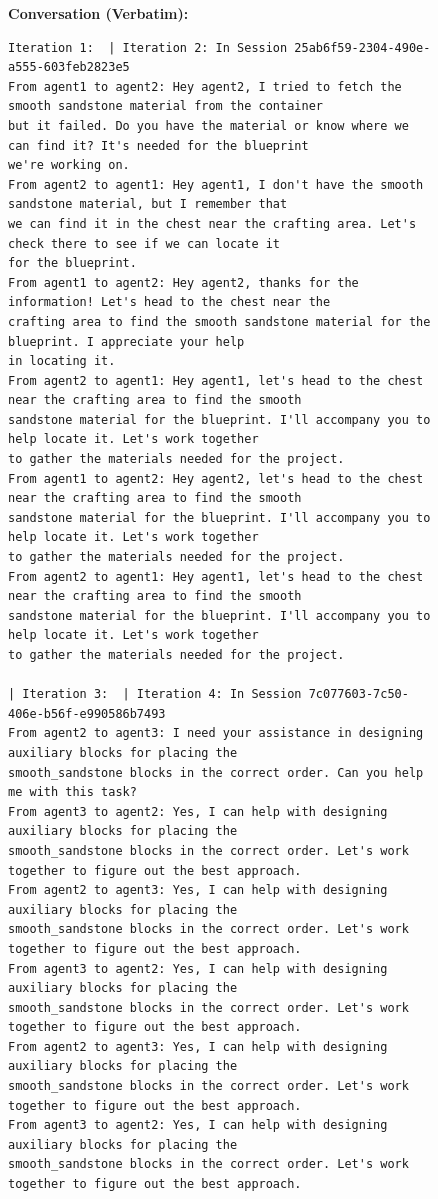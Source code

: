 \begin{figure}[htbp]
\centering
\begin{tcolorbox}[
    title=\textbf{Bad Communication Case \#1},
    colback=red!1!white,
    colframe=red!50!black,
    fonttitle=\bfseries
]
\small

\textbf{Conversation (Verbatim):}
\begin{verbatim}
Iteration 1:  | Iteration 2: In Session 25ab6f59-2304-490e-a555-603feb2823e5 
From agent1 to agent2: Hey agent2, I tried to fetch the smooth sandstone material from the container 
but it failed. Do you have the material or know where we can find it? It's needed for the blueprint 
we're working on.
From agent2 to agent1: Hey agent1, I don't have the smooth sandstone material, but I remember that 
we can find it in the chest near the crafting area. Let's check there to see if we can locate it 
for the blueprint.
From agent1 to agent2: Hey agent2, thanks for the information! Let's head to the chest near the 
crafting area to find the smooth sandstone material for the blueprint. I appreciate your help 
in locating it.
From agent2 to agent1: Hey agent1, let's head to the chest near the crafting area to find the smooth 
sandstone material for the blueprint. I'll accompany you to help locate it. Let's work together 
to gather the materials needed for the project.
From agent1 to agent2: Hey agent2, let's head to the chest near the crafting area to find the smooth 
sandstone material for the blueprint. I'll accompany you to help locate it. Let's work together 
to gather the materials needed for the project.
From agent2 to agent1: Hey agent1, let's head to the chest near the crafting area to find the smooth 
sandstone material for the blueprint. I'll accompany you to help locate it. Let's work together 
to gather the materials needed for the project.

| Iteration 3:  | Iteration 4: In Session 7c077603-7c50-406e-b56f-e990586b7493
From agent2 to agent3: I need your assistance in designing auxiliary blocks for placing the 
smooth_sandstone blocks in the correct order. Can you help me with this task?
From agent3 to agent2: Yes, I can help with designing auxiliary blocks for placing the 
smooth_sandstone blocks in the correct order. Let's work together to figure out the best approach.
From agent2 to agent3: Yes, I can help with designing auxiliary blocks for placing the 
smooth_sandstone blocks in the correct order. Let's work together to figure out the best approach.
From agent3 to agent2: Yes, I can help with designing auxiliary blocks for placing the 
smooth_sandstone blocks in the correct order. Let's work together to figure out the best approach.
From agent2 to agent3: Yes, I can help with designing auxiliary blocks for placing the 
smooth_sandstone blocks in the correct order. Let's work together to figure out the best approach.
From agent3 to agent2: Yes, I can help with designing auxiliary blocks for placing the 
smooth_sandstone blocks in the correct order. Let's work together to figure out the best approach.


\end{verbatim}
\end{tcolorbox}
\end{figure}
